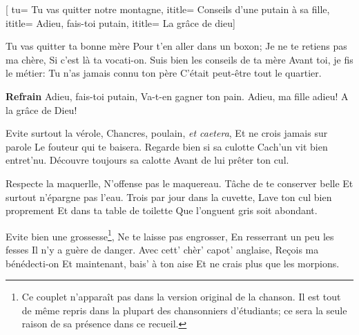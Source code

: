 [
tu= {Tu vas quitter notre montagne},
ititle= {Conseils d'une putain à sa fille},
ititle= {Adieu, fais-toi putain},
ititle= {La grâce de dieu}]


\beginverse
Tu vas quitter ta bonne mère
Pour t'en aller dans un boxon;
Je ne te retiens pas ma chère,
Si c'est là ta vocati-on.
Suis bien les conseils de ta mère
Avant toi, je fis le métier:
Tu n'as jamais connu ton père
C'était peut-être tout le quartier.
\endverse

\beginchorus
\textbf {Refrain}
Adieu, fais-toi putain,
Va-t-en gagner ton pain.
Adieu, ma fille adieu!
A la grâce de Dieu!
\endchorus

\beginverse
Evite surtout la vérole,
Chancres, poulain, \textit {et caetera},
Et ne crois jamais sur parole
Le fouteur qui te baisera.
Regarde bien si sa culotte
Cach'un vit bien entret'nu.
Découvre toujours sa calotte
Avant de lui prêter ton cul.
\endverse

\beginverse
Respecte la maquerlle,
N'offense pas le maquereau.
Tâche de te conserver belle
Et surtout n'épargne pas l'eau.
Trois par jour dans la cuvette, 
Lave ton cul bien proprement
Et dans ta table de toilette
Que l'onguent gris soit abondant.
\endverse

\beginverse
Evite bien une grossesse\footnote {Ce couplet n'apparaît pas dans la version original de la chanson. Il est tout de même repris dans la plupart des chansonniers d'étudiants; ce sera la seule raison de sa présence dans ce recueil.},
Ne te laisse pas engrosser,
En resserrant un peu les fesses
Il n'y a guère de danger.
Avec cett' chèr' capot' anglaise,
Reçois ma bénédecti-on
Et maintenant, bais' à ton aise
Et ne crais plus que les morpions.
\endverse

\endsong